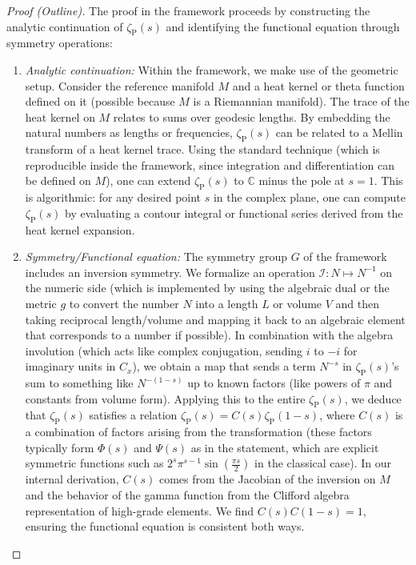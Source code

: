 \documentclass[11pt]{article}
\begin{document}
\begin{proof}[Proof (Outline)]
The proof in the framework proceeds by constructing the analytic continuation of $\zeta_{\mathrm{P}}(s)$ and identifying the functional equation through symmetry operations:
\begin{enumerate}
\item \emph{Analytic continuation:} Within the framework, we make use of the geometric setup. Consider the reference manifold $M$ and a heat kernel or theta function defined on it (possible because $M$ is a Riemannian manifold). The trace of the heat kernel on $M$ relates to sums over geodesic lengths. By embedding the natural numbers as lengths or frequencies, $\zeta_{\mathrm{P}}(s)$ can be related to a Mellin transform of a heat kernel trace. Using the standard technique (which is reproducible inside the framework, since integration and differentiation can be defined on $M$), one can extend $\zeta_{\mathrm{P}}(s)$ to $\mathbb{C}$ minus the pole at $s=1$. This is algorithmic: for any desired point $s$ in the complex plane, one can compute $\zeta_{\mathrm{P}}(s)$ by evaluating a contour integral or functional series derived from the heat kernel expansion.

\item \emph{Symmetry/Functional equation:} The symmetry group $G$ of the framework includes an inversion symmetry. We formalize an operation $\mathcal{I}: N \mapsto N^{-1}$ on the numeric side (which is implemented by using the algebraic dual or the metric $g$ to convert the number $N$ into a length $L$ or volume $V$ and then taking reciprocal length/volume and mapping it back to an algebraic element that corresponds to a number if possible). In combination with the algebra involution (which acts like complex conjugation, sending $i$ to $-i$ for imaginary units in $C_x$), we obtain a map that sends a term $N^{-s}$ in $\zeta_{\mathrm{P}}(s)$'s sum to something like $N^{-(1-s)}$ up to known factors (like powers of $\pi$ and constants from volume form). Applying this to the entire $\zeta_{\mathrm{P}}(s)$, we deduce that $\zeta_{\mathrm{P}}(s)$ satisfies a relation $\zeta_{\mathrm{P}}(s) = C(s)\zeta_{\mathrm{P}}(1-s)$, where $C(s)$ is a combination of factors arising from the transformation (these factors typically form $\Phi(s)$ and $\Psi(s)$ as in the statement, which are explicit symmetric functions such as $2^s\pi^{s-1}\sin(\frac{\pi s}{2})$ in the classical case). In our internal derivation, $C(s)$ comes from the Jacobian of the inversion on $M$ and the behavior of the gamma function from the Clifford algebra representation of high-grade elements. We find $C(s)C(1-s)=1$, ensuring the functional equation is consistent both ways.


\end{enumerate}
\end{proof}
\end{document}
